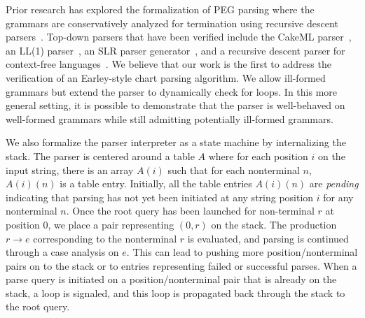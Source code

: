 \documentclass[sigplan,10pt,anonymous,review]{acmart}\settopmatter{printfolios=true,printccs=false,printacmref=false}
\newcommand{\prodn}[2]{#1 \rightarrow #2}
\begin{document}
\begin{CCSXML}
Prior research has explored the formalization of PEG parsing
where the grammars are conservatively analyzed for termination using recursive
descent parsers~\cite{trx,blaudeau2020verified}\@.  Top-down parsers
that have been verified include the CakeML parser~\cite{DBLP:conf/popl/KumarMNO14},
an LL(1) parser~\cite{DBLP:conf/itp/LasserCFR19}, an SLR parser generator~\cite{conf/esop/BarthwalN09}, and a recursive descent parser for context-free languages~\cite{conf/cpp/Ridge11}\@.  We believe that our work is the first to address the
verification of an Earley-style chart parsing algorithm.  We allow ill-formed
grammars but extend the parser to dynamically check for loops.  
In this more general setting, it is possible to demonstrate that the
parser is well-behaved on well-formed grammars while still admitting potentially
ill-formed grammars.  

We also formalize the parser interpreter as a state machine by
internalizing the stack. The parser is centered around a table 
$A$ where for each position $i$ on the input string, there is
an array $A(i)$ such that for each nonterminal $n$, $A(i)(n)$ is a
table entry.  Initially, all the table entries $A(i)(n)$ are
\emph{pending} indicating that parsing has not yet been initiated at
any string position $i$ for any nonterminal $n$\@.  Once the root
query has been launched for non-terminal $r$ at position $0$, we place
a pair representing $(0, r)$ on the stack.  The production
$\prodn{r}{e}$ corresponding to the nonterminal $r$ is evaluated, and
parsing is continued through a case analysis on $e$.  This can lead to
pushing more position/nonterminal pairs on to the stack or to entries
representing failed or successful parses.  When a parse query is
initiated on a position/nonterminal pair that is already on the stack,
a loop is signaled, and this loop is propagated back through the stack
to the root query.


\end{CCSXML}
\end{document}
